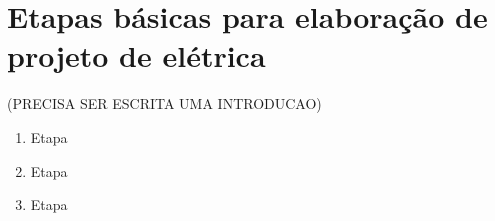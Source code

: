 \section{Etapas básicas para elaboração de projeto de elétrica} \label{section: referencias}

(PRECISA SER ESCRITA UMA INTRODUCAO)
\begin{enumerate}
	\item Etapa 
	\item Etapa 
	\item Etapa 
\end{enumerate}







\newpage